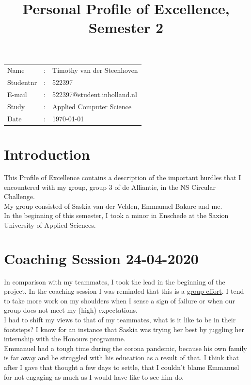 \documentclass[11pt]{article}
\title{\textbf{Personal Profile of Excellence, Semester 2}}
\author{}
\date{\date{14 Juni 2019}}
\begin{document}
	
	\maketitle

	\begin{table}[H]
		\centering
		\begin{tabular}{l c l}
		Name	& : & Timothy van der Steenhoven\\ 
		Studentnr & : & 522397\\
		E-mail &:& 522397@student.inholland.nl\\
		Study &:&Applied Computer Science \\ 
		Date &: & \today\\
		\end{tabular}
	\end{table}

\section*{Introduction}

This Profile of Excellence contains a description of the important hurdles that I encountered with my group, group 3 of de Alliantie, in the NS Circular Challenge.\\


My group consisted of Saskia van der Velden, Emmanuel Bakare and me. \\


In the beginning of this semester, I took a minor in Enschede at the Saxion University of Applied Sciences.

\section{Coaching Session 24-04-2020}

In comparison with my teammates, I took the lead in the beginning of the project. In the coaching session I was reminded that this is a \underline{group effort}. I tend to take more work on my shoulders when I sense a sign of failure or when our group does not meet my (high) expectations. \\

I had to shift my views to that of my teammates, what is it like to be in their footsteps? 
I know for an instance that Saskia was trying her best by juggling her internship with the Honours programme.\\

Emmanuel had a tough time during the corona pandemic, because his own family is far away and he struggled with his education as a result of that. I think that after I gave that thought a few days to settle, that I couldn't blame Emmanuel for not engaging as much as I would have like to see him do.\\
\end{document}

